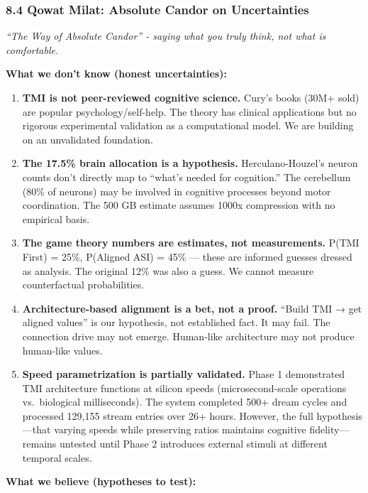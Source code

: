 \documentclass[
  11pt,
]{article}
\begin{document}
\subsubsection{8.4 Qowat Milat: Absolute Candor on
Uncertainties}\label{qowat-milat-absolute-candor-on-uncertainties}

\emph{``The Way of Absolute Candor'' - saying what you truly think, not
what is comfortable.}

\textbf{What we don't know (honest uncertainties):}

\begin{enumerate}
\def\labelenumi{\arabic{enumi}.}
\item
  \textbf{TMI is not peer-reviewed cognitive science.} Cury's books
  (30M+ sold) are popular psychology/self-help. The theory has clinical
  applications but no rigorous experimental validation as a
  computational model. We are building on an unvalidated foundation.
\item
  \textbf{The 17.5\% brain allocation is a hypothesis.}
  Herculano-Houzel's neuron counts don't directly map to ``what's needed
  for cognition.'' The cerebellum (80\% of neurons) may be involved in
  cognitive processes beyond motor coordination. The 500 GB estimate
  assumes 1000x compression with no empirical basis.
\item
  \textbf{The game theory numbers are estimates, not measurements.}
  P(TMI First) = 25\%, P(Aligned ASI) = 45\% --- these are informed
  guesses dressed as analysis. The original 12\% was also a guess. We
  cannot measure counterfactual probabilities.
\item
  \textbf{Architecture-based alignment is a bet, not a proof.} ``Build
  TMI → get aligned values'' is our hypothesis, not established fact. It
  may fail. The connection drive may not emerge. Human-like architecture
  may not produce human-like values.
\item
  \textbf{Speed parametrization is partially validated.} Phase 1
  demonstrated TMI architecture functions at silicon speeds
  (microsecond-scale operations vs.~biological milliseconds). The system
  completed 500+ dream cycles and processed 129,155 stream entries over
  26+ hours. However, the full hypothesis---that varying speeds while
  preserving ratios maintains cognitive fidelity---remains untested
  until Phase 2 introduces external stimuli at different temporal
  scales.
\end{enumerate}

\textbf{What we believe (hypotheses to test):}
\end{document}
